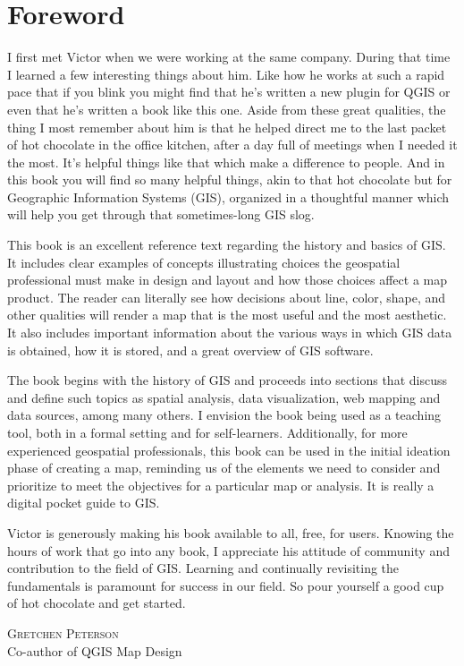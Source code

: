 \chapter*{Foreword}

I first met Victor when we were working at the same company. During that time I learned a few interesting things about him. Like how he works at such a rapid pace that if you blink you might find that he's written a new plugin for QGIS or even that he's written a book like this one. Aside from these great qualities, the thing I most remember about him is that he helped direct me to the last packet of hot chocolate in the office kitchen, after a day full of meetings when I needed it the most. It's helpful things like that which make a difference to people. And in this book you will find so many helpful things, akin to that hot chocolate but for Geographic Information Systems (GIS), organized in a thoughtful manner which will help you get through that sometimes-long GIS slog.


This book is an excellent reference text regarding the history and basics of GIS. It includes clear examples of concepts illustrating choices the geospatial professional must make in design and layout and how those choices affect a map product. The reader can literally see how decisions about line, color, shape, and other qualities will render a map that is the most useful and the most aesthetic. It also includes important information about the various ways in which GIS data is obtained, how it is stored, and a great overview of GIS software.

The book begins with the history of GIS and proceeds into sections that discuss and define such topics as spatial analysis, data visualization, web mapping and data sources, among many others. I envision the book being used as a teaching tool, both in a formal setting and for self-learners. Additionally, for more experienced geospatial professionals, this book can be used in the initial ideation phase of creating a map, reminding us of the elements we need to consider and prioritize to meet the objectives for a particular map or analysis. It is really a digital pocket guide to GIS.

Victor is generously making his book available to all, free, for users. Knowing the hours of work that go into any book, I appreciate his attitude of community and contribution to the field of GIS. Learning and continually revisiting the fundamentals is paramount for success in our field. So pour yourself a good cup of hot chocolate and get started.  



\begin{flushright}
\textsc{Gretchen Peterson}\\
Co-author of QGIS Map Design
\end{flushright}